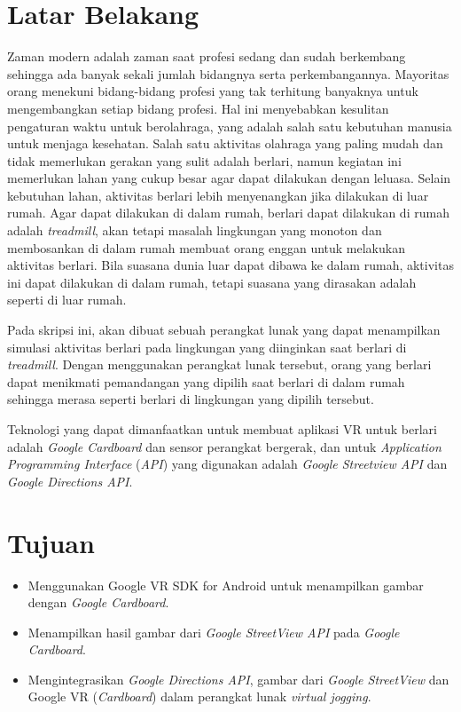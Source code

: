 \documentclass[a4paper,twoside]{article}
\begin{document}
\section{Latar Belakang}
Zaman modern adalah zaman saat profesi sedang dan sudah berkembang sehingga ada banyak sekali jumlah bidangnya serta perkembangannya. Mayoritas orang menekuni bidang-bidang profesi yang tak terhitung banyaknya untuk mengembangkan setiap bidang profesi. Hal ini menyebabkan kesulitan pengaturan waktu untuk berolahraga, yang adalah salah satu kebutuhan manusia untuk menjaga kesehatan. Salah satu aktivitas olahraga yang paling mudah dan tidak memerlukan gerakan yang sulit adalah berlari, namun kegiatan ini memerlukan lahan yang cukup besar agar dapat dilakukan dengan leluasa. Selain kebutuhan lahan, aktivitas berlari lebih menyenangkan jika dilakukan di luar rumah. Agar dapat dilakukan di dalam rumah, berlari dapat dilakukan di rumah adalah {\it treadmill}, akan tetapi masalah lingkungan yang monoton dan membosankan di dalam rumah membuat orang enggan untuk melakukan aktivitas berlari. Bila suasana dunia luar dapat dibawa ke dalam rumah, aktivitas ini dapat dilakukan di dalam rumah, tetapi suasana yang dirasakan adalah seperti di luar rumah. 

Pada skripsi ini, akan dibuat sebuah perangkat lunak yang dapat menampilkan simulasi aktivitas berlari pada lingkungan yang diinginkan saat berlari di {\it treadmill}. Dengan menggunakan perangkat lunak tersebut, orang yang berlari dapat menikmati pemandangan yang dipilih saat berlari di dalam rumah sehingga merasa seperti berlari di lingkungan yang dipilih tersebut.

Teknologi yang dapat dimanfaatkan untuk membuat aplikasi VR untuk berlari adalah \textit{Google Cardboard} dan sensor perangkat bergerak, dan untuk {\it Application Programming Interface} (\textit{API}) yang digunakan adalah {\it Google Streetview API}  dan {\it Google Directions API}.

\section{Tujuan}
\begin{itemize}
	\item Menggunakan Google VR SDK for Android untuk menampilkan gambar dengan {\it Google Cardboard}.
	\item Menampilkan hasil gambar dari \textit{Google StreetView API} pada {\it Google Cardboard}.
	\item Mengintegrasikan \textit{Google Directions API}, gambar dari \textit{Google StreetView} dan Google VR (\textit{Cardboard}) dalam perangkat lunak {\it virtual jogging}.
\end{itemize}
\end{document}

